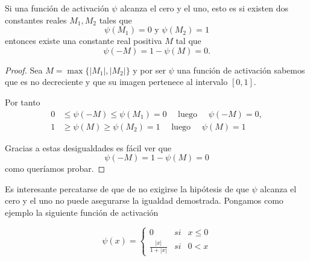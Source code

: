 \begin{lema} \label{lema:propio_1_antes_teorema_2_5}
    Si una función de activación  $\psi$ alcanza el cero y el uno, esto es 
    si existen dos constantes reales $M_1, M_2$ 
    tales que 
    \begin{equation}
        \psi(M_1) = 0 \text{ y } \psi(M_2)=1
    \end{equation}
    entonces existe una constante real positiva $M$ tal que 
    \begin{equation}
        \psi(-M) = 1- \psi(M) = 0.
    \end{equation}
\end{lema}
\begin{proof}
Sea $M = \max \{|M_1|,|M_2|\}$ y por ser $\psi$ una función de activación sabemos que
es no decreciente y que su imagen pertenece al intervalo $[0,1].$

Por tanto
\begin{align}
      0 &\leq \psi(-M) \leq \psi(M_1) = 0 \quad \text{ luego } \quad \psi(-M) = 0, \\
      1 &\geq \psi(M) \geq \psi(M_2) = 1 \quad \text{ luego } \quad\psi(M) = 1
\end{align}

Gracias a estas desigualdades es fácil ver que 
\begin{equation}
    \psi(-M) = 1 - \psi(M) = 0
\end{equation}
como queríamos probar. 
\end{proof}   

Es interesante percatarse de que de no exigirse la hipótesis de 
que $\psi$ alcanza el cero y el uno no puede 
asegurarse la igualdad demostrada. Pongamos como ejemplo la siguiente función de activación

\begin{equation}
    \psi(x)= \left\{ \begin{array}{lcc}
        0 &   si  & x \leq 0 \\
        \frac{| x |}{1+ | x |}&  si & 0< x  
        \end{array}
    \right. 
\end{equation}

